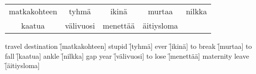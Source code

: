
\begin{center}
  \begin{tabular}{|c c c c c|}
    \hline
    matkakohteen & tyhmä & ikinä & murtaa & nilkka  \\
    kaatua & välivuosi & menettää & äitiysloma & \\
    \hline
  \end{tabular}
\end{center}

\begin{questions}
  \begin{multicols}{3}
    \raggedcolumns
    \question travel destination \f[matkakohteen]
    \question stupid             \f[tyhmä]
    \question ever               \f[ikinä]
    \question to break           \f[murtaa]
    \question to fall            \f[kaatua]
    \question ankle              \f[nilkka]
    \question gap year           \f[välivuosi]
    \question to lose            \f[menettää]
    \question maternity leave    \f[äitiysloma]
  \end{multicols}
\end{questions}
